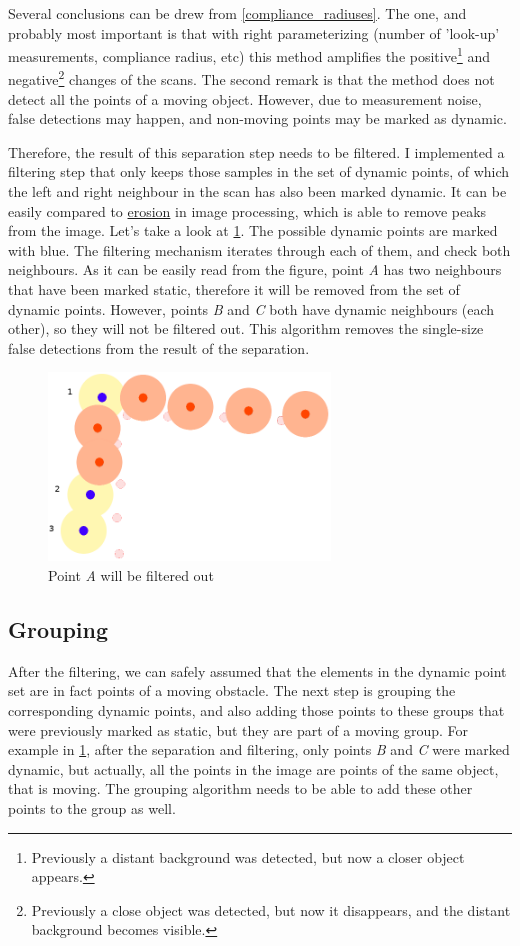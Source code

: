 Several conclusions can be drew from \ref{compliance_radiuses}. The one, and probably most important is that with right parameterizing (number of 'look-up' measurements, compliance radius, etc) this method amplifies the positive\footnote{Previously a distant background was detected, but now a closer object appears.} and negative\footnote{Previously a close object was detected, but now it disappears, and the distant background becomes visible.} changes of the scans. The second remark is that the method does not detect all the points of a moving object. However, due to measurement noise, false detections may happen, and non-moving points may be marked as dynamic.

Therefore, the result of this separation step needs to be filtered. I implemented a filtering step that only keeps those samples in the set of dynamic points, of which the left and right neighbour in the scan has also been marked dynamic. It can be easily compared to \href{https://en.wikipedia.org/wiki/Erosion_(morphology)}{erosion} in image processing, which is able to remove peaks from the image. Let's take a look at \ref{dynamic_points}. The possible dynamic points are marked with blue. The filtering mechanism iterates through each of them, and check both neighbours. As it can be easily read from the figure, point \textit{A} has two neighbours that have been marked static, therefore it will be removed from the set of dynamic points. However, points \textit{B} and \textit{C} both have dynamic neighbours (each other), so they will not be filtered out. This algorithm removes the single-size false detections from the result of the separation.

\begin{figure}[!ht]
    \centering
    \includegraphics[height=50mm]{figures/raw/dynamic_points.png}
    \caption{Point \textit{A} will be filtered out}
    \label{dynamic_points}
\end{figure}

\subsection{Grouping}
After the filtering, we can safely assumed that the elements in the dynamic point set are in fact points of a moving obstacle. The next step is grouping the corresponding dynamic points, and also adding those points to these groups that were previously marked as static, but they are part of a moving group. For example in \ref{dynamic_points}, after the separation and filtering, only points \textit{B} and \textit{C} were marked dynamic, but actually, all the points in the image are points of the same object, that is moving. The grouping algorithm needs to be able to add these other points to the group as well.

